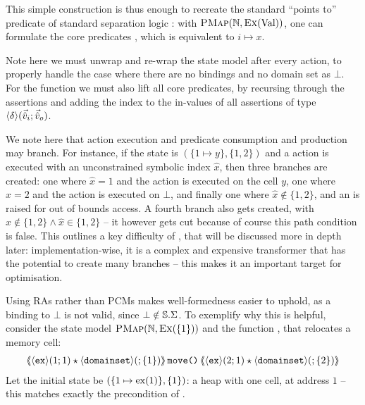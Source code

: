 This simple construction is thus enough to recreate the standard ``points to'' predicate of standard separation logic \cite{seplogic1, seplogic2}: with $\textsc{PMap}(\mathbb N, \textsc{Ex}(\text{Val}))$, one can formulate the core predicates , which is equivalent to $i \mapsto x$.

Note here we must unwrap and re-wrap the state model after every action, to properly handle the case where there are no bindings and no domain set as $\bot$. For the \fix{} function we must also lift all core predicates, by recursing through the assertions and adding the index to the in-values of all assertions of type $\left<\delta\right>\!(\vec{\hat{v}}_i;\vec{\hat{v}}_o)$.

We note here that action execution and predicate consumption and production may branch. For instance, if the state is $(\{ 1\mapsto y \}, \{ 1,2\})$ and a \load{} action is executed with an unconstrained symbolic index $\hat x$, then three branches are created: one where $\hat x = 1$ and the action is executed on the cell $y$, one where $\hat x = 2$ and the action is executed on $\bot$, and finally one where $\hat x\notin \{1,2\}$, and an \Err{} is raised for out of bounds access. A fourth branch also gets created, with $\hat x\notin \{ 1,2\} \land \hat x\in \{1,2\}$ -- it however gets cut because of course this path condition is false. This outlines a key difficulty of \PMap{}, that will be discussed more in depth later: implementation-wise, it is a complex and expensive transformer that has the potential to create many branches -- this makes it an important target for optimisation.

Using RAs rather than PCMs makes well-formedness easier to uphold, as a binding to $\bot$ is not valid, since $\bot \notin \mathbb S.\Sigma$. To exemplify why this is helpful, consider the state model $\textsc{PMap}(\mathbb N, \textsc{Ex}(\{1\}))$ and the function , that relocates a memory cell:
\begin{align*}
\ESLtriple{\corepred{\exP}{1}{1} \star \corepred{\domainset}{}{\{1\}}}{\code{move()}}{\corepred{\exP}{2}{1} \star \corepred{\domainset}{}{\{2\}}}
\end{align*}
Let the initial state be $(\{ 1\mapsto \text{ex}(1)\}, \{ 1\} )$: a heap with one cell, at address $1$ -- this matches exactly the precondition of .

